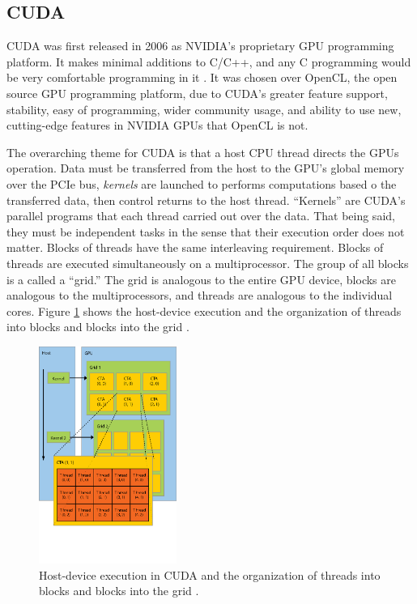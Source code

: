 \subsection{CUDA}

CUDA was first released in 2006 as NVIDIA's proprietary GPU programming platform.  It makes minimal additions to C/C++, and any C programming would be very comfortable programming in it \cite{cuda}.  It was chosen over OpenCL, the open source GPU programming platform, due to CUDA's greater feature support, stability, easy of programming, wider community usage, and ability to use new, cutting-edge features in NVIDIA GPUs that OpenCL is not.

The overarching theme for CUDA is that a host CPU thread directs the GPUs operation.  Data must be transferred from the host to the GPU's global memory over the PCIe bus, \emph{kernels} are launched to performs computations based o the transferred data, then control returns to the host thread.  ``Kernels'' are CUDA's parallel programs that each thread carried out over the data.  That being said, they must be independent tasks in the sense that their execution order does not matter.  Blocks of threads have the same interleaving requirement.  Blocks of threads are executed simultaneously on a multiprocessor.  The group of all blocks is a called a ``grid.''  The grid is analogous to the entire GPU device, blocks are analogous to the multiprocessors, and threads are analogous to the individual cores. Figure \ref{cuda_grid_launch} shows the host-device execution and the organization of threads into blocks and blocks into the grid \cite{cuda}.

\begin{figure}[h!] 
  \centering
    \includegraphics[width=0.4\textwidth,trim= 0cm 2.5cm 0cm 0cm]{graphics/CUDA_grid_launch.eps}
     \caption{ Host-device execution in CUDA and the organization of threads into blocks and blocks into the grid \cite{cuda_ptx_isa}. \label{cuda_grid_launch}}
\end{figure}


